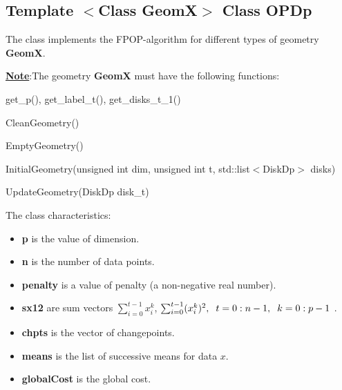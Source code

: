 \documentclass{report}
\begin{document}
	\subsection*{Template  $<$Class GeomX$>$ Class OPDp}
	\label{OPDp}
	
	The class implements the FPOP-algorithm for different types of geometry {\bfseries GeomX}.
		
		\underline{\bfseries Note}:The geometry {\bfseries GeomX} must have the following functions:
	\begin{itemize}
		{\bfseries 
		\item get\_p(), get\_label\_t(), get\_disks\_t\_1()
		\item CleanGeometry()
		\item EmptyGeometry()
		\item InitialGeometry(unsigned int dim, unsigned int t, std::list$<$DiskDp$>$ disks)
		\item UpdateGeometry(DiskDp disk\_t)
		}	 
	\end{itemize}
	The class characteristics:
	\begin{itemize}
		\item {\bfseries p} is the value of dimension.
			\item {\bfseries n} is the number of data points.
			\item {\bfseries penalty} is a value of penalty (a non-negative real number).
			\item {\bfseries sx12} are sum vectors $\sum_{i=0}^{t-1}x^k_i$,  $\sum_{i=0}^{t-1} (x^k_i)^2,  \hspace*{2mm}  t = 0:n-1,  \hspace*{2mm}  k = 0:p-1$ .
			\item {\bfseries chpts} is the vector of changepoints.	
			\item {\bfseries means} is the list of successive means for data  $x$.
			\item {\bfseries globalCost} is the global cost.		
	\end{itemize}
		
\end{document}

